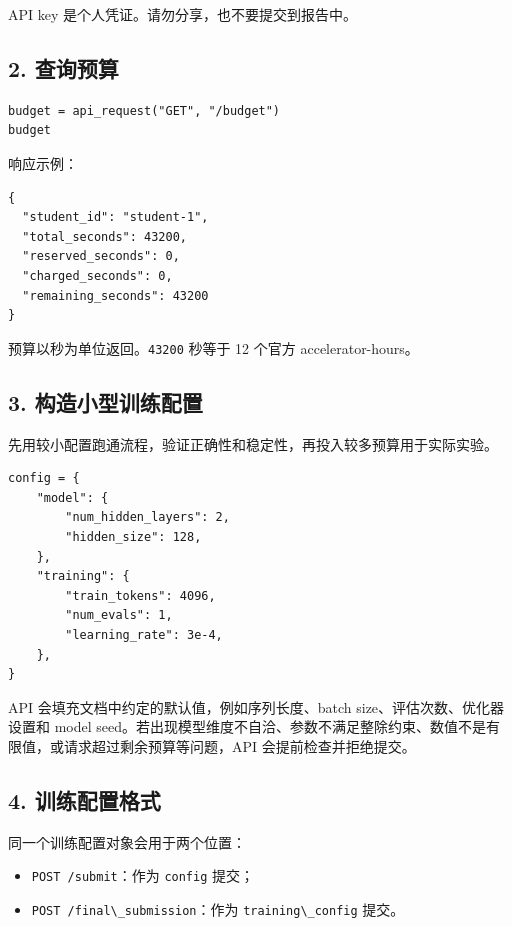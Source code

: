 \documentclass[
]{ctexart}
\newcommand{\passthrough}[1]{#1}
\providecommand{\tightlist}{%
  \setlength{\itemsep}{0pt}\setlength{\parskip}{0pt}}
\begin{document}
API key 是个人凭证。请勿分享，也不要提交到报告中。

\hypertarget{ux67e5ux8be2ux9884ux7b97}{%
\subsection{2. 查询预算}\label{ux67e5ux8be2ux9884ux7b97}}

\begin{verbatim}
budget = api_request("GET", "/budget")
budget
\end{verbatim}

响应示例：

\begin{verbatim}
{
  "student_id": "student-1",
  "total_seconds": 43200,
  "reserved_seconds": 0,
  "charged_seconds": 0,
  "remaining_seconds": 43200
}
\end{verbatim}

预算以秒为单位返回。\passthrough{\lstinline!43200!} 秒等于 12 个官方
accelerator-hours。

\hypertarget{ux6784ux9020ux5c0fux578bux8badux7ec3ux914dux7f6e}{%
\subsection{3.
构造小型训练配置}\label{ux6784ux9020ux5c0fux578bux8badux7ec3ux914dux7f6e}}

先用较小配置跑通流程，验证正确性和稳定性，再投入较多预算用于实际实验。

\begin{verbatim}
config = {
    "model": {
        "num_hidden_layers": 2,
        "hidden_size": 128,
    },
    "training": {
        "train_tokens": 4096,
        "num_evals": 1,
        "learning_rate": 3e-4,
    },
}
\end{verbatim}

API 会填充文档中约定的默认值，例如序列长度、batch
size、评估次数、优化器设置和 model
seed。若出现模型维度不自洽、参数不满足整除约束、数值不是有限值，或请求超过剩余预算等问题，API
会提前检查并拒绝提交。

\hypertarget{ux8badux7ec3ux914dux7f6eux683cux5f0f}{%
\subsection{4. 训练配置格式}\label{ux8badux7ec3ux914dux7f6eux683cux5f0f}}

同一个训练配置对象会用于两个位置：

\begin{itemize}
\tightlist
\item
  \passthrough{\lstinline!POST /submit!}：作为
  \passthrough{\lstinline!config!} 提交；
\item
  \passthrough{\lstinline!POST /final\_submission!}：作为
  \passthrough{\lstinline!training\_config!} 提交。
\end{itemize}
\end{document}
